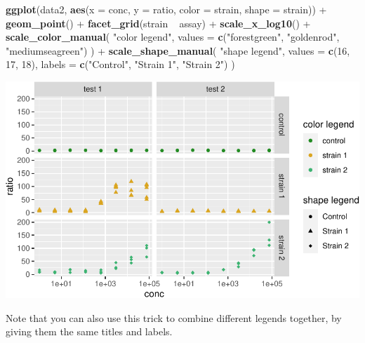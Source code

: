 \documentclass[]{book}
\newenvironment{Shaded}{}{}
\newcommand{\DataTypeTok}[1]{\textcolor[rgb]{0.56,0.13,0.00}{#1}}
\newcommand{\DecValTok}[1]{\textcolor[rgb]{0.25,0.63,0.44}{#1}}
\newcommand{\KeywordTok}[1]{\textcolor[rgb]{0.00,0.44,0.13}{\textbf{#1}}}
\newcommand{\NormalTok}[1]{#1}
\newcommand{\OperatorTok}[1]{\textcolor[rgb]{0.40,0.40,0.40}{#1}}
\newcommand{\StringTok}[1]{\textcolor[rgb]{0.25,0.44,0.63}{#1}}
\begin{document}
\begin{Shaded}
\begin{Highlighting}[]
\KeywordTok{ggplot}\NormalTok{(data2, }\KeywordTok{aes}\NormalTok{(}\DataTypeTok{x =}\NormalTok{ conc, }\DataTypeTok{y =}\NormalTok{ ratio, }\DataTypeTok{color =}\NormalTok{ strain, }\DataTypeTok{shape =}\NormalTok{ strain)) }\OperatorTok{+}
\StringTok{  }\KeywordTok{geom_point}\NormalTok{() }\OperatorTok{+}
\StringTok{  }\KeywordTok{facet_grid}\NormalTok{(strain }\OperatorTok{~}\StringTok{ }\NormalTok{assay) }\OperatorTok{+}
\StringTok{  }\KeywordTok{scale_x_log10}\NormalTok{() }\OperatorTok{+}
\StringTok{  }\KeywordTok{scale_color_manual}\NormalTok{(}
    \StringTok{"color legend"}\NormalTok{, }\DataTypeTok{values =} \KeywordTok{c}\NormalTok{(}\StringTok{"forestgreen"}\NormalTok{, }\StringTok{"goldenrod"}\NormalTok{, }\StringTok{"mediumseagreen"}\NormalTok{)}
\NormalTok{  ) }\OperatorTok{+}
\StringTok{  }\KeywordTok{scale_shape_manual}\NormalTok{(}
    \StringTok{"shape legend"}\NormalTok{, }\DataTypeTok{values =} \KeywordTok{c}\NormalTok{(}\DecValTok{16}\NormalTok{, }\DecValTok{17}\NormalTok{, }\DecValTok{18}\NormalTok{), }
    \DataTypeTok{labels =} \KeywordTok{c}\NormalTok{(}\StringTok{"Control"}\NormalTok{, }\StringTok{"Strain 1"}\NormalTok{, }\StringTok{"Strain 2"}\NormalTok{)}
\NormalTok{  )}
\end{Highlighting}
\end{Shaded}

\begin{center}\includegraphics[width=\textwidth]{TRES-Tidy-Tutorial_files/figure-latex/unnamed-chunk-149-1} \end{center}

Note that you can also use this trick to combine different legends together, by giving them the same titles and labels.
\end{document}
